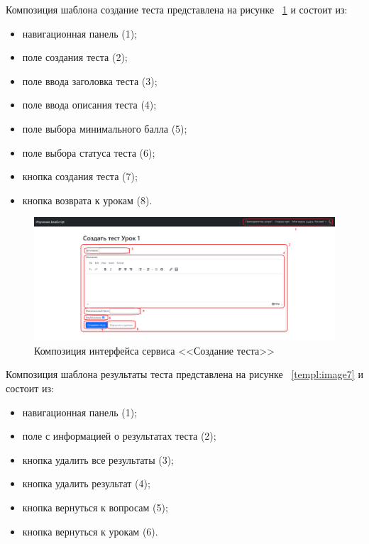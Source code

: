 Композиция шаблона создание теста представлена на рисунке ~\ref{templ:image6} и состоит из:

\begin{itemize}
	\item навигационная панель (1);
	\item поле создания теста (2);
	\item поле ввода заголовка теста (3);
	\item поле ввода описания теста (4);
	\item поле выбора минимального балла (5);
	\item поле выбора статуса теста (6);
	\item кнопка создания теста (7);
	\item кнопка возврата к урокам (8).
\end{itemize}

\begin{figure}[h]
	\centering
	\includegraphics[width=1\linewidth]{images/создатьтест}
	\caption{Композиция интерфейса сервиса <<Создание теста>>}
	\label{templ:image6}
\end{figure}


Композиция шаблона результаты теста представлена на рисунке ~\ref{templ:image7} и состоит из:

\begin{itemize}
	\item навигационная панель (1);
	\item поле с информацией о результатах теста (2);
	\item кнопка удалить все результаты (3);
	\item кнопка удалить результат (4);
	\item кнопка вернуться к вопросам (5);
	\item кнопка вернуться к урокам (6).
\end{itemize}

